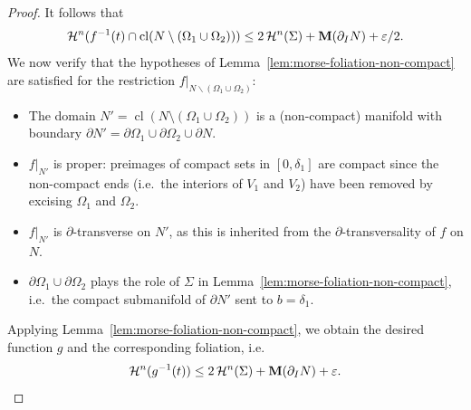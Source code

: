 \begin{proof}
        It follows that
        \begin{equation*}
            \mathcal{H}^n(f^{-1}(t) \cap \operatorname{cl}(N\setminus(\Omega_1\cup\Omega_2))) \leq 2\,\mathcal{H}^n(\Sigma) + \mathbf{M}(\partial_I N) + \varepsilon/2.
        \end{equation*}
        We now verify that the hypotheses of Lemma~\ref{lem:morse-foliation-non-compact} are satisfied for the restriction $f|_{N\backslash(\Omega_1\cup\Omega_2)}$:
        \begin{itemize}
            \item The domain $N' = \operatorname{cl}(N \setminus (\Omega_1 \cup \Omega_2))$ is a (non-compact) manifold with boundary $\partial N' = \partial\Omega_1 \cup \partial\Omega_2 \cup \partial N$.
            \item $f|_{N'}$ is proper: preimages of compact sets in $[0, \delta_1]$ are compact since the non-compact ends (i.e.\ the interiors of $V_1$ and $V_2$) have been removed by excising $\Omega_1$ and $\Omega_2$.
            \item $f|_{N'}$ is $\partial$-transverse on $N'$, as this is inherited from the $\partial$-transversality of $f$ on $N$.
            \item $\partial\Omega_1 \cup \partial\Omega_2$ plays the role of $\Sigma$ in Lemma~\ref{lem:morse-foliation-non-compact}, i.e.\ the compact submanifold of $\partial N'$ sent to $b = \delta_1$.
        \end{itemize}
        Applying Lemma~\ref{lem:morse-foliation-non-compact}, we obtain the desired function $g$ and the corresponding foliation, i.e.
        \begin{equation*}
            \mathcal{H}^n(g^{-1}(t)) \leq 2\,\mathcal{H}^n(\Sigma) + \mathbf{M}(\partial_I N) + \varepsilon.
        \end{equation*}
    \end{proof}
